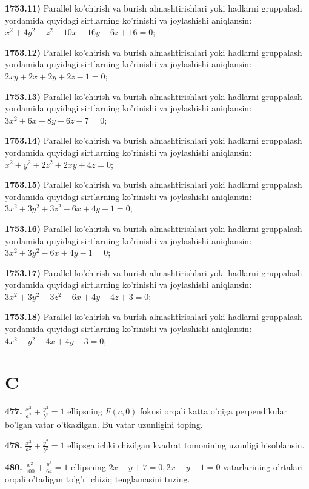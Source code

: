 \textbf{1753.11)} Parallel ko'chirish va burish almashtirishlari yoki hadlarni gruppalash yordamida quyidagi sirtlarning ko'rinishi va joylashishi aniqlansin: \(x^{2} + 4y^{2} - z^{2} - 10x - 16y + 6z + 16 = 0\);

\textbf{1753.12)} Parallel ko'chirish va burish almashtirishlari yoki hadlarni gruppalash yordamida quyidagi sirtlarning ko'rinishi va joylashishi aniqlansin: \(2xy + 2x + 2y + 2z - 1 = 0\);

\textbf{1753.13)} Parallel ko'chirish va burish almashtirishlari yoki hadlarni gruppalash yordamida quyidagi sirtlarning ko'rinishi va joylashishi aniqlansin: \(3x^{2} + 6x - 8y + 6z - 7 = 0\);

\textbf{1753.14)} Parallel ko'chirish va burish almashtirishlari yoki hadlarni gruppalash yordamida quyidagi sirtlarning ko'rinishi va joylashishi aniqlansin: \(x^{2} + y^{2} + 2z^{2} + 2xy + 4z = 0\);

\textbf{1753.15)} Parallel ko'chirish va burish almashtirishlari yoki hadlarni gruppalash yordamida quyidagi sirtlarning ko'rinishi va joylashishi aniqlansin: \(3x^{2} + 3y^{2} + 3z^{2} - 6x + 4y - 1 = 0\);

\textbf{1753.16)} Parallel ko'chirish va burish almashtirishlari yoki hadlarni gruppalash yordamida quyidagi sirtlarning ko'rinishi va joylashishi aniqlansin: \(3x^{2} + 3y^{2} - 6x + 4y - 1 = 0\);

\textbf{1753.17)} Parallel ko'chirish va burish almashtirishlari yoki hadlarni gruppalash yordamida quyidagi sirtlarning ko'rinishi va joylashishi aniqlansin: \(3x^{2} + 3y^{2} - 3z^{2} - 6x + 4y + 4z + 3 = 0\);

\textbf{1753.18)} Parallel ko'chirish va burish almashtirishlari yoki hadlarni gruppalash yordamida quyidagi sirtlarning ko'rinishi va joylashishi aniqlansin: \(4x^{2} - y^{2} - 4x + 4y - 3 = 0\);

\section{C}\label{c}

\textbf{477.} \(\frac{x^{2}}{a^{2}} + \frac{y^{2}}{b^{2}} = 1\) ellipsning \(F(c,0)\) fokusi orqali katta o'qiga perpendikular bo'lgan vatar o'tkazilgan. Bu vatar uzunligini toping.

\textbf{478.} \(\frac{x^{2}}{a^{2}} + \frac{y^{2}}{b^{2}} = 1\) ellipsga ichki chizilgan kvadrat tomonining uzunligi hisoblansin.

\textbf{480.} \(\frac{x^{2}}{100} + \frac{y^{2}}{64} = 1\) ellipsning \(2x - y + 7 = 0,2x - y - 1 = 0\) vatarlarining o'rtalari orqali o'tadigan to'g'ri chiziq tenglamasini tuzing.

